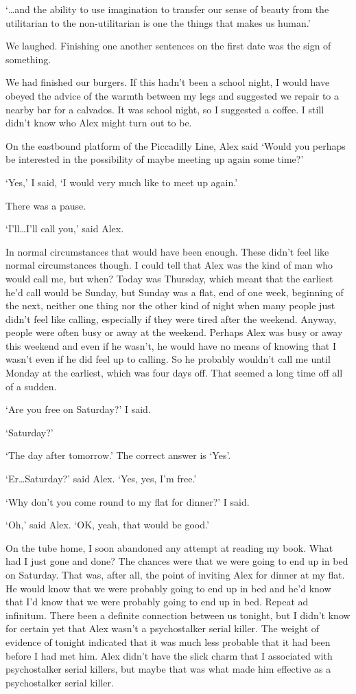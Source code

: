 `{\dots}and the ability to use imagination to transfer our sense of
beauty from the utilitarian to the non-utilitarian is one the things
that makes us human.'

We laughed. Finishing one another sentences on the first date was
the sign of something.

We had finished our burgers. If this hadn't been a school night, I
would have obeyed the advice of the warmth between my legs and
suggested we repair to a nearby bar for a calvados. It was school
night, so I suggested a coffee. I still didn't know who Alex might
turn out to be.

On the eastbound platform of the Piccadilly Line, Alex said `Would
you perhaps be interested in the possibility of maybe meeting up
again some time?'

`Yes,' I said, `I would very much like to meet up again.'

There was a pause.

`I'll\dots I'll call you,' said Alex.

In normal circumstances that would have been enough. These didn't
feel like normal circumstances though. I could tell that Alex was
the kind of man who would call me, but when? Today was Thursday,
which meant that the earliest he'd call would be Sunday, but Sunday
was a flat, end of one week, beginning of the next, neither one
thing nor the other kind of night when many people just didn't feel
like calling, especially if they were tired after the weekend.
Anyway, people were often busy or away at the weekend. Perhaps Alex
was busy or away this weekend and even if he wasn't, he would have
no means of knowing that I wasn't even if he did feel up to calling.
So he probably wouldn't call me until Monday at the earliest, which
was four days off. That seemed a long time off all of a sudden.

`Are you free on Saturday?' I said.

`Saturday?'

`The day after tomorrow.' The correct answer is `Yes'.

`Er\dots Saturday?' said Alex. `Yes, yes, I'm free.'

`Why don't you come round to my flat for dinner?' I said.

`Oh,' said Alex. `OK, yeah, that would be good.'

On the tube home, I soon abandoned any attempt at reading my book.
What had I just gone and done? The chances were that we were going
to end up in bed on Saturday. That was, after all, the point of
inviting Alex for dinner at my flat. He would know that we were
probably going to end up in bed and he'd know that I'd know that we
were probably going to end up in bed. Repeat {\twelveit ad
infinitum.\/} There been a definite connection between us tonight,
but I didn't know for certain yet that Alex wasn't a psychostalker
serial killer. The weight of evidence of tonight indicated that it
was much less probable that it had been before I had met him. Alex
didn't have the slick charm that I associated with psychostalker
serial killers, but maybe that was what made him effective as a
psychostalker serial killer.

